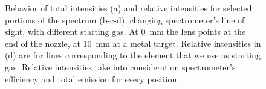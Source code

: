 \begin{figure}
\centering
  
  
  \hfill
\caption{Behavior of total intensities (a) and relative intensities for selected portions of the spectrum (b-c-d), changing spectrometer's line of sight, with different starting gas. At \SI{0}{\milli\meter} the lens points at the end of the nozzle, at \SI{10}{\milli\meter} at a metal target. Relative intensities in (d) are for lines corresponding to the element that we use as starting gas. Relative intensities take into consideration spectrometer's efficiency and total emission for every position.}
 \label{fig:Irel_pos}
\end{figure}

